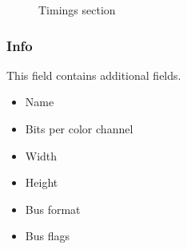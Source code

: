 \documentclass{article}
\begin{document}
		\begin{figure}
			\centering
			
			\label{figure:Configuration}
			\caption{Timings section}
		\end{figure}

		\subsubsection{Info}
		This field contains additional fields.
		\begin{itemize}
			\item Name
			\item Bits per color channel
			\item Width
			\item Height
			\item Bus format
			\item Bus flags
		\end{itemize}
\end{document}
